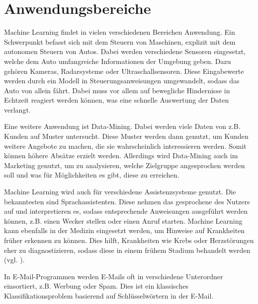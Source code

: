 \section{Anwendungsbereiche}
\label{sec:anwendungsbereiche}
Machine Learning findet in vielen verschiedenen Bereichen Anwendung. Ein Schwerpunkt befasst sich mit dem Steuern von Maschinen, explizit mit dem autonomen Steuern von Autos. Dabei werden verschiedene Sensoren eingesetzt, welche dem Auto umfangreiche Informationen der Umgebung geben. Dazu gehören Kameras, Radarsysteme oder Ultraschallsensoren. Diese Eingabewerte werden durch ein Modell in Steuerungsanweisungen umgewandelt, sodass das Auto von allein fährt. Dabei muss vor allem auf bewegliche Hindernisse in Echtzeit reagiert werden können, was eine schnelle Auswertung der Daten verlangt.

Eine weitere Anwendung ist Data-Mining. Dabei werden viele Daten von z.B. Kunden auf Muster untersucht. Diese Muster werden dann genutzt, um Kunden weitere Angebote zu machen, die sie wahrscheinlich interessieren werden. Somit können höhere Absätze erzielt werden. Allerdings wird Data-Mining auch im Marketing genutzt, um zu analysieren, welche Zielgruppe angesprochen werden soll und was für Möglichkeiten es gibt, diese zu erreichen.

Machine Learning wird auch für verschiedene Assistenzsysteme genutzt. Die bekanntesten sind Sprachassistenten. Diese nehmen das gesprochene des Nutzers auf und interpretieren es, sodass entsprechende Anweisungen ausgeführt werden können, z.B. einen Wecker stellen oder einen Anruf starten.
Machine Learning kann ebenfalls in der Medizin eingesetzt werden, um Hinweise auf Krankheiten früher erkennen zu können. Dies hilft, Krankheiten wie Krebs oder Herzstörungen eher zu diagnostizieren, sodass diese in einem frühem Stadium behandelt werden (vgl. \cite[]{AnwendungsBsp}).

In E-Mail-Programmen werden E-Mails oft in verschiedene Unterordner einsortiert, z.B. Werbung oder Spam. Dies ist ein klassisches Klassifikationsproblem basierend auf Schlüsselwörtern in der E-Mail.